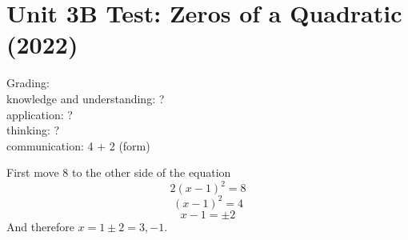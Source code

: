 \documentclass{article}
\begin{document}
\section*{Unit 3B Test: Zeros of a Quadratic (2022)}
Grading:\\
knowledge and understanding: ?\\
application: ?\\
thinking: ?\\
communication: 4 + 2 (form)\\

\vskip 1cm

\vskip 0.5cm
\textbf{\color{red}{We}} First move $8$ to the other side of the equation
\[
	2(x-1)^2=8
\]
\[
	(x-1)^2=4
\]
\[
	x-1=\pm2
\]
And therefore $x=1\pm2=3,-1$.
\vskip 1cm
\\
\end{document}

